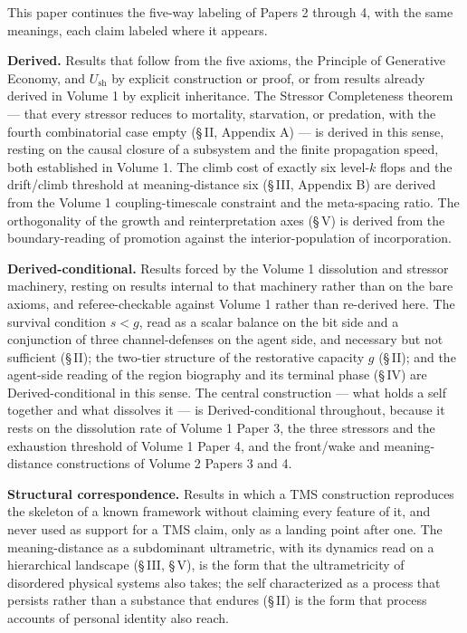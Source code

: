\documentclass[11pt,oneside]{report}
\theoremstyle{definition}
\theoremstyle{remark}
\begin{document}
This paper continues the five-way labeling of Papers 2 through 4, with the same meanings, each claim labeled where it appears.

\textbf{Derived.} Results that follow from the five axioms, the Principle of Generative Economy, and \ensuremath{U_{\mathrm{sh}}} by explicit construction or proof, or from results already derived in Volume 1 by explicit inheritance. The Stressor Completeness theorem --- that every stressor reduces to mortality, starvation, or predation, with the fourth combinatorial case empty (\S\,II, Appendix A) --- is derived in this sense, resting on the causal closure of a subsystem and the finite propagation speed, both established in Volume 1. The climb cost of exactly six level-\ensuremath{k} flops and the drift/climb threshold at meaning-distance six (\S\,III, Appendix B) are derived from the Volume 1 coupling-timescale constraint and the meta-spacing ratio. The orthogonality of the growth and reinterpretation axes (\S\,V) is derived from the boundary-reading of promotion against the interior-population of incorporation.

\textbf{Derived-conditional.} Results forced by the Volume 1 dissolution and stressor machinery, resting on results internal to that machinery rather than on the bare axioms, and referee-checkable against Volume 1 rather than re-derived here. The survival condition \ensuremath{s < g}, read as a scalar balance on the bit side and a conjunction of three channel-defenses on the agent side, and necessary but not sufficient (\S\,II); the two-tier structure of the restorative capacity \ensuremath{g} (\S\,II); and the agent-side reading of the region biography and its terminal phase (\S\,IV) are Derived-conditional in this sense. The central construction --- what holds a self together and what dissolves it --- is Derived-conditional throughout, because it rests on the dissolution rate of Volume 1 Paper 3, the three stressors and the exhaustion threshold of Volume 1 Paper 4, and the front/wake and meaning-distance constructions of Volume 2 Papers 3 and 4.

\textbf{Structural correspondence.} Results in which a TMS construction reproduces the skeleton of a known framework without claiming every feature of it, and never used as support for a TMS claim, only as a landing point after one. The meaning-distance as a subdominant ultrametric, with its dynamics read on a hierarchical landscape (\S\,III, \S\,V), is the form that the ultrametricity of disordered physical systems also takes; the self characterized as a process that persists rather than a substance that endures (\S\,II) is the form that process accounts of personal identity also reach.
\end{document}
